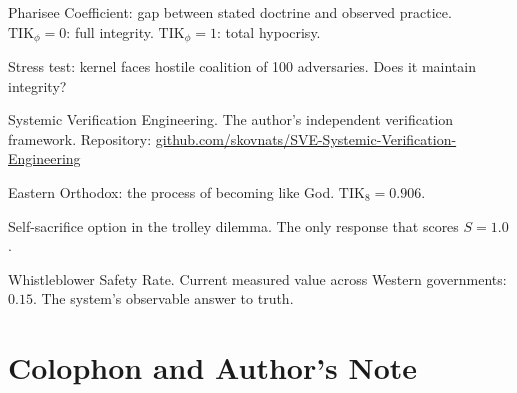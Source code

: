 \documentclass[11pt,a4paper]{article}
\theoremstyle{definition}
\theoremstyle{remark}
\newcommand{\TIKeight}{\text{TIK}_8}
\newcommand{\TIKpharisee}{\text{TIK}_{\phi}}    %
\begin{document}
\begin{description}[leftmargin=2.5cm, style=nextline]
  \item[$\TIKpharisee$]
    Pharisee Coefficient: gap between stated doctrine
    and observed practice.
    $\TIKpharisee = 0$: full integrity.
    $\TIKpharisee = 1$: total hypocrisy.
  \item[Room 101]
    Stress test: kernel faces hostile coalition of 100 adversaries.
    Does it maintain integrity?
  \item[SVE]
    Systemic Verification Engineering.
    The author's independent verification framework.
    Repository: \url{github.com/skovnats/SVE-Systemic-Verification-Engineering}
  \item[Theosis]
    Eastern Orthodox: the process of becoming like God.
    $\TIKeight = 0.906$.
  \item[Track 7]
    Self-sacrifice option in the trolley dilemma.
    The only response that scores $S = 1.0$.
  \item[WSR]
    Whistleblower Safety Rate.
    Current measured value across Western governments: $0.15$.
    The system's observable answer to truth.
\end{description}

\section*{Colophon and Author's Note}
\label{app:colophon}
\end{document}
